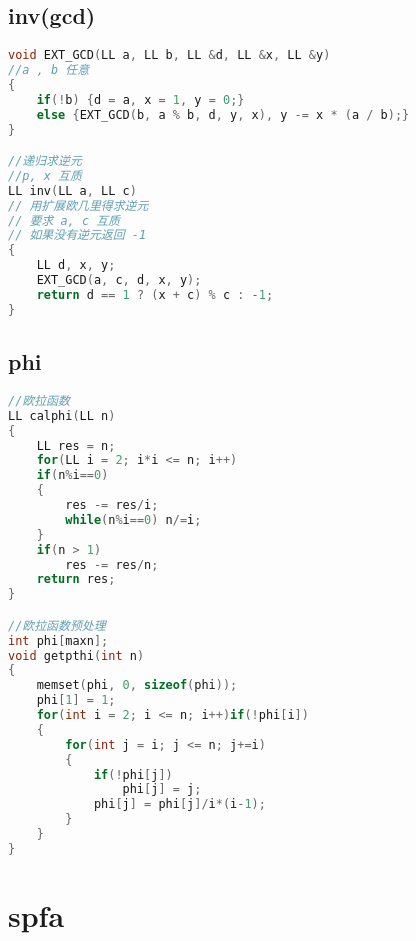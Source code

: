 \subsection{inv(gcd)}
\begin{lstlisting}[language=C++]
void EXT_GCD(LL a, LL b, LL &d, LL &x, LL &y)
//a , b 任意
{
    if(!b) {d = a, x = 1, y = 0;}
    else {EXT_GCD(b, a % b, d, y, x), y -= x * (a / b);}
}

//递归求逆元
//p, x 互质
LL inv(LL a, LL c)
// 用扩展欧几里得求逆元
// 要求 a, c 互质
// 如果没有逆元返回 -1
{
	LL d, x, y;
	EXT_GCD(a, c, d, x, y);
	return d == 1 ? (x + c) % c : -1;
}
\end{lstlisting}
\subsection{phi}
\begin{lstlisting}[language=C++]
//欧拉函数
LL calphi(LL n)
{
    LL res = n;
    for(LL i = 2; i*i <= n; i++)
	if(n%i==0)
    {
        res -= res/i;
        while(n%i==0) n/=i;
    }
    if(n > 1)
        res -= res/n;
    return res;
}

//欧拉函数预处理
int phi[maxn];
void getpthi(int n)
{
    memset(phi, 0, sizeof(phi));
    phi[1] = 1;
    for(int i = 2; i <= n; i++)if(!phi[i])
    {
        for(int j = i; j <= n; j+=i)
        {
            if(!phi[j])
                phi[j] = j;
            phi[j] = phi[j]/i*(i-1);
        }
    }
}
\end{lstlisting}

\section{spfa}
